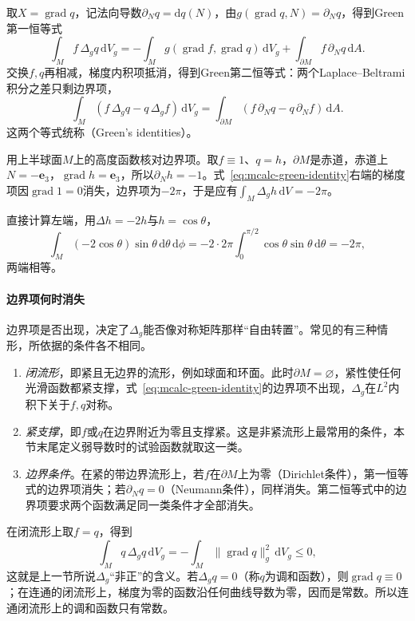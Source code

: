 取$X=\operatorname{grad}q$，记法向导数$\partial_Nq=\mathrm dq(N)$，由$g(\operatorname{grad}q,N)=\partial_Nq$，得到Green第一恒等式
\begin{equation}
\int_Mf\,\Delta_gq\,\mathrm dV_g=-\int_Mg(\operatorname{grad}f,\operatorname{grad}q)\,\mathrm dV_g+\int_{\partial M}f\,\partial_Nq\,\mathrm dA .
\label{eq:mcalc-green-identity}
\end{equation}
交换$f,q$再相减，梯度内积项抵消，得到Green第二恒等式：两个Laplace--Beltrami积分之差只剩边界项，
\begin{equation}
\int_M(f\,\Delta_gq-q\,\Delta_gf)\,\mathrm dV_g=\int_{\partial M}(f\,\partial_Nq-q\,\partial_Nf)\,\mathrm dA .
\label{eq:mcalc-green-second}
\end{equation}
这两个等式统称（Green's identities）。

用上半球面$M$上的高度函数核对边界项。取$f\equiv1$、$q=h$，$\partial M$是赤道，赤道上$N=-\bm e_3$，$\operatorname{grad}h=\bm e_3$，所以$\partial_Nh=-1$。式~\eqref{eq:mcalc-green-identity}右端的梯度项因$\operatorname{grad}1=0$消失，边界项为$-2\pi$，于是应有$\int_M\Delta_gh\,\mathrm dV=-2\pi$。

直接计算左端，用$\Delta h=-2h$与$h=\cos\theta$，
\[
\int_M(-2\cos\theta)\sin\theta\,\mathrm d\theta\,\mathrm d\phi=-2\cdot2\pi\int_0^{\pi/2}\cos\theta\sin\theta\,\mathrm d\theta=-2\pi ,
\]
两端相等。

\paragraph{边界项何时消失}
边界项是否出现，决定了$\Delta_g$能否像对称矩阵那样“自由转置”。常见的有三种情形，所依据的条件各不相同。
\begin{enumerate}
\item \emph{闭流形}，即紧且无边界的流形，例如球面和环面。此时$\partial M=\varnothing$，紧性使任何光滑函数都紧支撑，式~\eqref{eq:mcalc-green-identity}的边界项不出现，$\Delta_g$在$L^2$内积下关于$f,q$对称。
\item \emph{紧支撑}，即$f$或$q$在边界附近为零且支撑紧。这是非紧流形上最常用的条件，本节末尾定义弱导数时的试验函数就取这一类。
\item \emph{边界条件}。在紧的带边界流形上，若$f$在$\partial M$上为零（Dirichlet条件），第一恒等式的边界项消失；若$\partial_Nq=0$（Neumann条件），同样消失。第二恒等式中的边界项要求两个函数满足同一类条件才全部消失。
\end{enumerate}

在闭流形上取$f=q$，得到
\begin{equation}
\int_Mq\,\Delta_gq\,\mathrm dV_g=-\int_M\lVert\operatorname{grad}q\rVert_g^2\,\mathrm dV_g\leq0 ,
\label{eq:mcalc-laplacian-nonpositive}
\end{equation}
这就是上一节所说$\Delta_g$“非正”的含义。若$\Delta_gq=0$（称$q$为调和函数），则$\operatorname{grad}q\equiv0$；在连通的闭流形上，梯度为零的函数沿任何曲线导数为零，因而是常数。所以连通闭流形上的调和函数只有常数。

